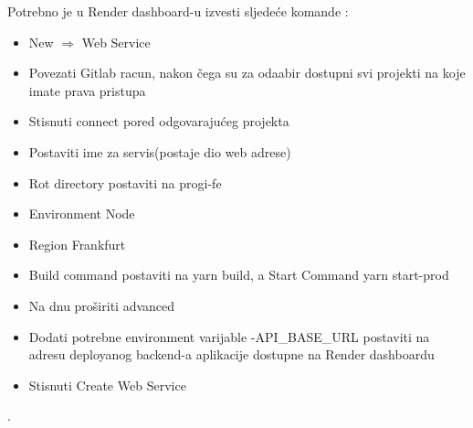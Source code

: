				{Potrebno je u Render dashboard-u izvesti sljedeće komande :
					\begin{itemize}
						\item New $\Rightarrow$ Web Service
						\item  Povezati Gitlab racun, nakon čega su za odaabir dostupni svi projekti na koje imate prava pristupa
						\item Stisnuti connect pored odgovarajućeg projekta
						\item Postaviti ime za servis(postaje dio web adrese)
						\item Rot directory postaviti na progi-fe
						\item Environment Node
						\item Region Frankfurt
						\item Build command postaviti na yarn build, a Start Command yarn start-prod
						\item Na dnu proširiti advanced
						\item Dodati potrebne environment varijable -API\_BASE\_URL postaviti na adresu deployanog backend-a aplikacije dostupne na Render dashboardu
						\item Stisnuti Create Web Service
				\end{itemize}}.\\
			
			
			\eject 